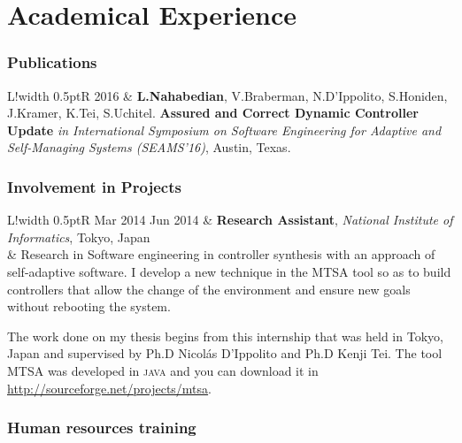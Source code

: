 \documentclass[10pt]{article}
\newcommand\VRule{\color{lightgray}\vrule width 0.5pt}
\begin{document}

\section*{Academical Experience}

\subsubsection*{Publications}

\begin{tabular}{L!{\VRule}R}
2016 & \textbf{L.Nahabedian}, V.Braberman, N.D'Ippolito, S.Honiden, J.Kramer, K.Tei, S.Uchitel. \textbf{Assured and Correct
Dynamic Controller Update} \textit{in International Symposium on Software Engineering for Adaptive and Self-Managing
Systems (SEAMS'16)}, Austin, Texas.\\
\end{tabular}

\subsubsection*{Involvement in Projects}

\begin{tabular}{L!{\VRule}R}
Mar 2014 Jun 2014 & \textbf{Research Assistant}, \textit{National Institute of Informatics}, Tokyo, Japan\\
& \vspace{-0.7cm} Research in Software engineering in controller synthesis with an approach of self-adaptive software. I develop a new
technique in the MTSA tool so as to build controllers that allow the change of the environment and ensure new goals
without rebooting the system.

The work done on my thesis begins from this internship that was held in Tokyo, Japan and supervised by Ph.D Nicol\'as
D'Ippolito and Ph.D Kenji Tei. The tool MTSA was developed in \textsc{java} and you can download it in
\url{http://sourceforge.net/projects/mtsa}.\\
\end{tabular}

\subsubsection*{Human resources training}
\end{document}
